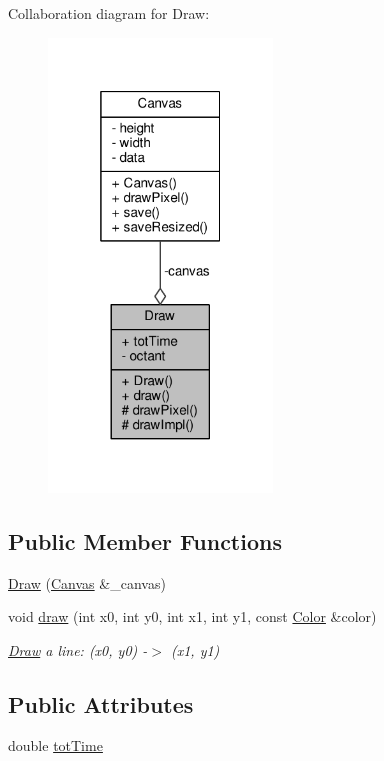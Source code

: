Collaboration diagram for Draw\+:\nopagebreak
\begin{figure}[H]
\begin{center}
\leavevmode
\includegraphics[width=169pt]{classDraw__coll__graph}
\end{center}
\end{figure}
\subsection*{Public Member Functions}
\begin{DoxyCompactItemize}
\item 
\hyperlink{classDraw_ab01ae8a362d3c42015e7c1634109fc7b}{Draw} (\hyperlink{classCanvas}{Canvas} \&\+\_\+canvas)
\item 
void \hyperlink{classDraw_a4948f44fd8928e53243deb5348567bb0}{draw} (int x0, int y0, int x1, int y1, const \hyperlink{canvas_8h_a084a39206618848fb8bc9187d3758c87}{Color} \&color)
\begin{DoxyCompactList}\small\item\em \hyperlink{classDraw}{Draw} a line\+: (x0, y0) -\/$>$ (x1, y1) \end{DoxyCompactList}\end{DoxyCompactItemize}
\subsection*{Public Attributes}
\begin{DoxyCompactItemize}
\item 
double \hyperlink{classDraw_aca821acc8a6745c5ef690ab84f65be7f}{tot\+Time}
\end{DoxyCompactItemize}
